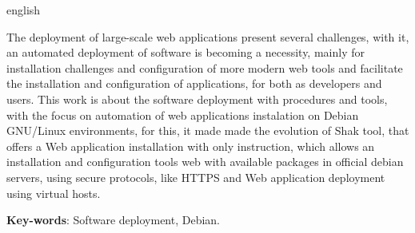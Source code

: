 \begin{resumo}[Abstract]
 \begin{otherlanguage*}{english}

   The deployment of large-scale web applications present several challenges, with
   it, an automated deployment of software is becoming a necessity, mainly for
   installation challenges and configuration of more modern web tools and
   facilitate the installation and configuration of applications, for both as
   developers and users. This work is about the software deployment with procedures
   and tools, with the focus on automation of web applications instalation on
   Debian GNU/Linux environments,
   for this, it made made the evolution of Shak tool, that offers a Web
   application installation with only instruction, which allows an installation
   and configuration tools web with available packages in official debian servers,
   using secure protocols, like HTTPS and Web application deployment using virtual hosts.
   \vspace{\onelineskip}

   \noindent
   \textbf{Key-words}: Software deployment, Debian.
 \end{otherlanguage*}
\end{resumo}
